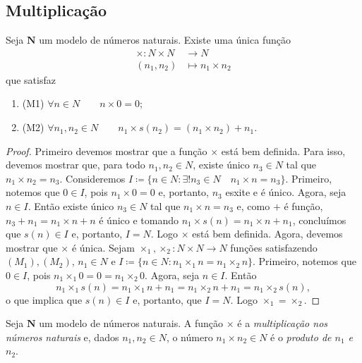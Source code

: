 \subsection{Multiplicação}

\begin{teo}
	Seja $\bm N$ um modelo de números naturais. Existe uma única função
	\begin{align*}
	\times: N \times N &\to N \\
			(n_1,n_2) &\mapsto n_1 \times n_2
	\end{align*}
que satisfaz
	\begin{enumerate}
	\item (M1) $\forall n \in N \qquad n \times 0 = 0$;
	\item (M2) $\forall n_1,n_2 \in N \qquad n_1 \times s(n_2) = (n_1 \times n_2) + n_1$.
	\end{enumerate}
\end{teo}
\begin{proof}
	Primeiro devemos mostrar que a função $\times$ está bem definida. Para isso, devemos mostrar que, para todo $n_1,n_2 \in N$, existe único $n_3 \in N$ tal que $n_1 \times n_2=n_3$. Consideremos $I \coloneqq \{n \in N : \exists! n_3 \in N \quad n_1 \times n = n_3\}$. Primeiro, notemos que $0 \in I$, pois $n_1 \times 0 = 0$ e, portanto, $n_3$ esxite e é único. Agora, seja $n \in I$. Então existe único $n_3 \in N$ tal que $n_1 \times n = n_3$ e, como $+$ é função, $n_3 + n_1=n_1 \times n + n$ é único e tomando $n_1 \times s(n)=n_1 \times n + n_1$, concluímos que $s(n) \in I$ e, portanto, $I=N$. Logo $\times$ está bem definida. Agora, devemos mostrar que $\times$ é única. Sejam $\times_1,\times_2: N \times N \to N$ funções satisfazendo $(M_1),(M_2)$, $n_1 \in N$ e $I \coloneqq \{n \in N : n_1 \times_1 n = n_1 \times_2 n\}$. Primeiro, notemos que $0 \in I$, pois $n_1 \times_1 0 = 0 = n_1 \times_2 0$. Agora, seja $n \in I$. Então
	\begin{equation*}
	n_1 \times_1 s(n) = n_1 \times_1 n + n_1 = n_1 \times_2 n + n_1 = n_1 \times_2 s(n),
	\end{equation*}
o que implica que $s(n) \in I$ e, portanto, que $I=N$. Logo $\times_1=\times_2$.
\end{proof}

\begin{defi}
	Seja $\bm N$ um modelo de números naturais. A função $\times$ é a \emph{multiplicação nos números naturais} e, dados $n_1,n_2 \in N$, o número $n_1 \times n_2 \in N$ é o \emph{produto de $n_1$ e $n_2$}.
\end{defi}

